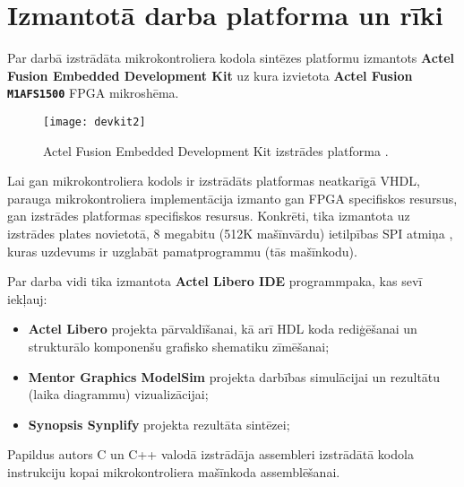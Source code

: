 \section{Izmantotā darba platforma un rīki} \label{sec:devkit}
Par darbā izstrādāta mikrokontroliera kodola sintēzes platformu izmantots
\textbf{Actel Fusion Embedded Development Kit} uz kura izvietota
\textbf{Actel Fusion \texttt{M1AFS1500}} FPGA mikroshēma.

\begin{figure}[thb]
	\centering
	\texttt{[image: devkit2]}
	\caption[Actel Fusion Embedded Development Kit izstrādes platforma.]
			{Actel Fusion Embedded Development Kit izstrādes platforma \cite[7.~lpp.]{FusionGuide}.}
	\label{fig:devkit}
\end{figure}

Lai gan mikrokontroliera kodols ir izstrādāts platformas neatkarīgā VHDL,
parauga mikrokontroliera implementācija izmanto gan FPGA specifiskos
resursus, gan izstrādes platformas specifiskos resursus. Konkrēti, tika
izmantota uz izstrādes plates novietotā, 8 megabitu (512K mašīnvārdu)
ietilpības SPI  atmiņa \cite{FusionGuide}, kuras uzdevums ir uzglabāt 
pamatprogrammu (tās mašīnkodu).

Par darba vidi tika izmantota \textbf{Actel Libero IDE} programmpaka, kas
sevī iekļauj:
\begin{itemize}
	\item \textbf{Actel Libero} projekta pārvaldīšanai,
		kā arī HDL koda rediģēšanai un strukturālo komponenšu 
		grafisko shematiku zīmēšanai;
	\item \textbf{Mentor Graphics ModelSim} projekta darbības simulācijai
		un rezultātu (laika diagrammu) vizualizācijai;
	\item \textbf{Synopsis Synplify} projekta rezultāta sintēzei;
\end{itemize}

Papildus autors C un C++ valodā izstrādāja assembleri
 izstrādātā kodola instrukciju kopai mikrokontroliera mašīnkoda assemblēšanai.
